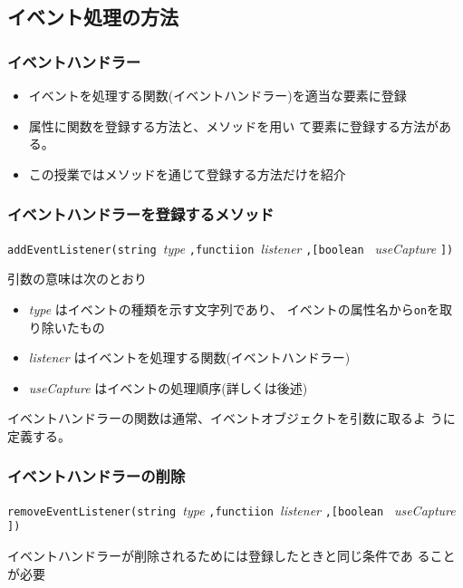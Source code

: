 \subsection{イベント処理の方法}
\begin{frame}[containsverbatim]
\frametitle{イベントハンドラー}
\begin{itemize}
 \item イベントを処理する関数(イベントハンドラー)を適当な要素に登録
 \item 属性に関数を登録する方法と、メソッドを用い
て要素に登録する方法がある。
 \item この授業ではメソッドを通じて登録する方法だけを紹介
\end{itemize}
\end{frame}
\begin{frame}[containsverbatim]
\frametitle{イベントハンドラーを登録するメソッド}
\texttt{addEventListener(string }{\sl type}
\texttt{,functiion }{\sl listener}
\texttt{,[boolean }
{\sl useCapture}
\texttt{])}

引数の意味は次のとおり
\begin{itemize}
 \item {\sl type} はイベントの種類を示す文字列であり、
イベントの属性名から\texttt{on}を取り除いたもの
 \item {\sl listener} はイベントを処理する関数(イベントハンドラー)
 \item {\sl useCapture} はイベントの処理順序(詳しくは後述)
\end{itemize}
イベントハンドラーの関数は通常、イベントオブジェクトを引数に取るよ
うに定義する。
\end{frame}
\begin{frame}[containsverbatim]
\frametitle{イベントハンドラーの削除}
\texttt{removeEventListener(string }{\sl type}
\texttt{,functiion }{\sl listener}
\texttt{,[boolean }
{\sl useCapture}
\texttt{])}

イベントハンドラーが削除されるためには登録したときと同じ条件であ
ることが必要
\end{frame}
